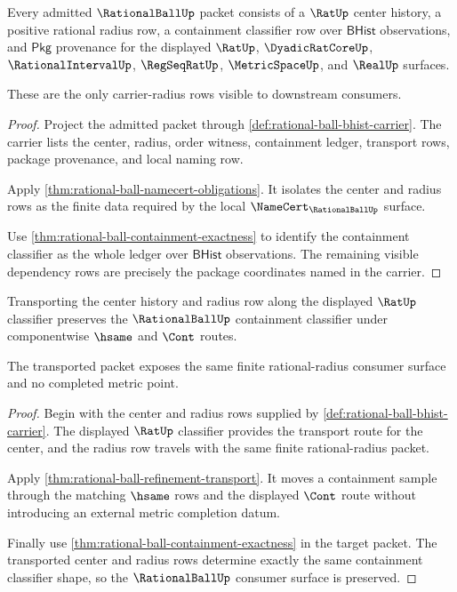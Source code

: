 \begin{theorem}
\label{thm:rationalball-carrier-radius-obligation}
Every admitted $\RationalBallUp$ packet consists of a $\RatUp$ center history,
a positive rational radius row, a containment classifier row over
$\mathsf{BHist}$ observations, and $\mathsf{Pkg}$ provenance for the displayed
$\RatUp$, $\DyadicRatCoreUp$, $\RationalIntervalUp$, $\RegSeqRatUp$,
$\MetricSpaceUp$, and $\RealUp$ surfaces.

These are the only carrier-radius rows visible to downstream consumers.
\end{theorem}
\begin{proof}
Project the admitted packet through \autoref{def:rational-ball-bhist-carrier}.
The carrier lists the center, radius, order witness, containment ledger,
transport rows, package provenance, and local naming row.

Apply \autoref{thm:rational-ball-namecert-obligations}. It isolates the
center and radius rows as the finite data required by the local
$\NameCert_{\RationalBallUp}$ surface.

Use \autoref{thm:rational-ball-containment-exactness} to identify the
containment classifier as the whole ledger over $\mathsf{BHist}$ observations.
The remaining visible dependency rows are precisely the package coordinates
named in the carrier.
\end{proof}

\begin{theorem}
\label{thm:rationalball-center-transport-obligation}
Transporting the center history and radius row along the displayed $\RatUp$
classifier preserves the $\RationalBallUp$ containment classifier under
componentwise $\hsame$ and $\Cont$ routes.

The transported packet exposes the same finite rational-radius consumer
surface and no completed metric point.
\end{theorem}
\begin{proof}
Begin with the center and radius rows supplied by
\autoref{def:rational-ball-bhist-carrier}. The displayed $\RatUp$ classifier
provides the transport route for the center, and the radius row travels with
the same finite rational-radius packet.

Apply \autoref{thm:rational-ball-refinement-transport}. It moves a containment
sample through the matching $\hsame$ rows and the displayed $\Cont$ route
without introducing an external metric completion datum.

Finally use \autoref{thm:rational-ball-containment-exactness} in the target
packet. The transported center and radius rows determine exactly the same
containment classifier shape, so the $\RationalBallUp$ consumer surface is
preserved.
\end{proof}


